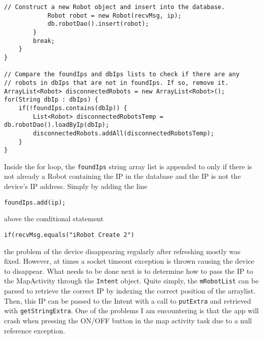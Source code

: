 \documentclass[fontsize=11pt, %
                             paper=a4, %
                             twoside, %
                             captions=tableheading,
                             index=totoc,
                             hyperref]{labbook}
\begin{document}
\begin{addmargin}[0cm]{0cm}
\begin{Verbatim}[tabsize=4]
			// Construct a new Robot object and insert into the database.
			Robot robot = new Robot(recvMsg, ip);
			db.robotDao().insert(robot);
		}
		break;
	}
}

// Compare the foundIps and dbIps lists to check if there are any
// robots in dbIps that are not in foundIps. If so, remove it.
ArrayList<Robot> disconnectedRobots = new ArrayList<Robot>();
for(String dbIp : dbIps) {
	if(!foundIps.contains(dbIp)) {
		List<Robot> disconnectedRobotsTemp = db.robotDao().loadByIp(dbIp);
		disconnectedRobots.addAll(disconnectedRobotsTemp);
	}
}
\end{Verbatim}
Inside the for loop, the \texttt{foundIps} string array list is appended to only if there is not already a Robot containing the IP in the database and the IP is not the device's IP address. Simply by adding the line
\begin{Verbatim}
foundIps.add(ip); 
\end{Verbatim}
above the conditional statement
\begin{Verbatim}
if(recvMsg.equals("iRobot Create 2")
\end{Verbatim}
the problem of the device disappearing regularly after refreshing mostly was fixed. However, at times a socket timeout exception is thrown causing the device to disappear.
\medbreak\noindent
What needs to be done next is to determine how to pass the IP to the MapActivity through the \texttt{Intent} object. Quite simply, the \texttt{mRobotList} can be parsed to retrieve the correct IP by indexing the correct position of the arraylist. Then, this IP can be passed to the Intent with a call to \texttt{putExtra} and retrieved with \texttt{getStringExtra}. One of the problems I am encountering is that the app will crash when pressing the ON/OFF button in the map activity task due to a null reference exception.


\end{addmargin}
\end{document}
